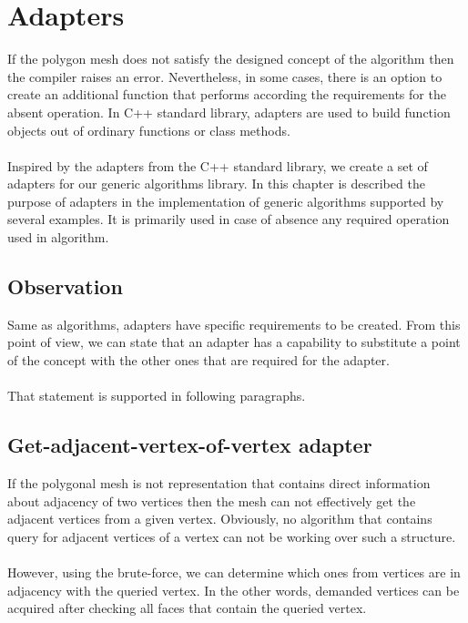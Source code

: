 \chapter{Adapters}

If the polygon mesh does not satisfy the designed concept of the algorithm then the compiler
raises an error. Nevertheless, in some cases, there is an option to create an additional function
that performs according the requirements for the absent operation.
In C++ standard library, adapters are used to build function objects out of ordinary
functions or class methods\cite{Simonis2000}.\\
\\
Inspired by the adapters from the C++ standard library, we create a set of adapters
for our generic algorithms library.
In this chapter is described the purpose of adapters in the implementation of generic algorithms
supported by several examples. It is primarily used in case of absence any required operation
used in algorithm.

\section{Observation}

Same as algorithms, adapters have specific requirements to be created. From this point of view,
we can state that an adapter has a capability to substitute a point of the concept with
the other ones that are required for the adapter.\\
\\
That statement is supported in following paragraphs.

\section{Get-adjacent-vertex-of-vertex adapter}

If the polygonal mesh is not representation that contains direct information about adjacency of two
vertices then the mesh can not effectively 
get the adjacent vertices from a given vertex. Obviously, no algorithm that contains query for
adjacent vertices of a vertex can not be working over such a structure.\\
\\
However, using the brute-force, we can determine which ones from vertices are in adjacency with
the queried vertex. In the other words, demanded vertices can be acquired after checking all
faces that contain the queried vertex.

